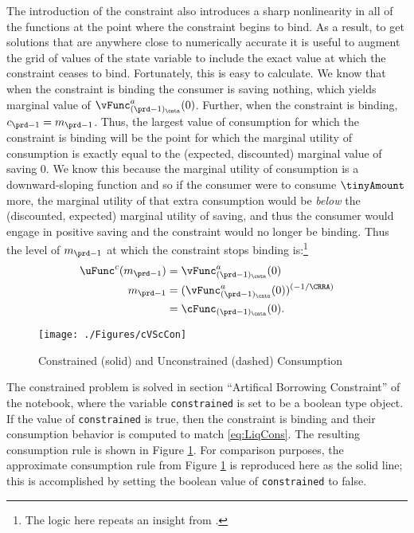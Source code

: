 \documentclass[\econtexRoot/SolvingMicroDSOPs]{subfiles}
\begin{document}
The introduction of the constraint also introduces a sharp
nonlinearity in all of the functions at the point where the constraint
begins to bind.  As a result, to get solutions that are anywhere close
to numerically accurate it is useful to augment the grid of values of
the state variable to include the exact value at which the constraint
ceases to bind.  Fortunately, this is easy to calculate.  We know that
when the constraint is binding the consumer is saving nothing, which
yields marginal value of $\vFunc^{a}_{({\prd-1})_\cntn}(0)$. Further, when the
constraint is binding, $c_{\prd-1} = m_{\prd-1}$.  Thus, the largest
value of consumption for which the constraint is binding will be the
point for which the marginal utility of consumption is exactly equal
to the (expected, discounted) marginal value of saving 0.  We know
this because the marginal utility of consumption is a downward-sloping
function and so if the consumer were to consume $\tinyAmount$ more,
the marginal utility of that extra consumption would be \textit{below}
the (discounted, expected) marginal utility of saving, and thus the
consumer would engage in positive saving and the constraint would no
longer be binding.  Thus the level of $m_{\prd-1}$ at which the
constraint stops binding is:\footnote{The logic here repeats an insight from \cite{deatonLiqConstr}.}
\begin{equation}\begin{gathered}\begin{aligned}
      \uFunc^{c}(m_{\prd-1})  & = \vFunc^{a}_{({\prd-1})_\cntn}(0)  \nonumber \\
      m_{\prd-1}  & = (\vFunc^{a}_{({\prd-1})_\cntn}(0))^{(-1/\CRRA)}  \nonumber
      \\        & = \cFunc_{({\prd-1})_\cntn}(0). \label{eq:LCbindsTm1}
    \end{aligned}\end{gathered}\end{equation}

\hypertarget{cVScCon}{}
\begin{figure}
  \texttt{[image: ./Figures/cVScCon]}
  \caption{Constrained (solid) and Unconstrained (dashed) Consumption}
  \label{fig:cVScCon}
\end{figure}

The constrained problem is solved in section ``Artifical Borrowing Constraint''
of the notebook, where the variable
\texttt{constrained} is set to be a boolean type object. If the value of \texttt{constrained}
is true, then the constraint is binding and their consumption behavior is computed to match
\eqref{eq:LiqCons}. The resulting consumption rule is shown in Figure \ref{fig:cVScCon}. For comparison purposes,
the approximate consumption rule from Figure \ref{fig:cVScCon} is
reproduced here as the solid line; this is accomplished by setting the boolean value
of \texttt{constrained} to false.
\end{document}
